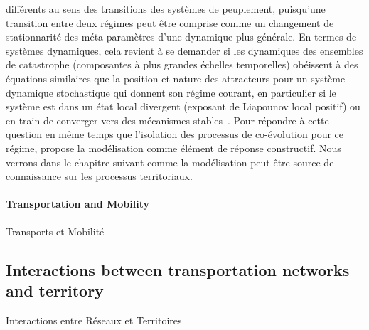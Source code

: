 {différents au sens des transitions des systèmes de peuplement, puisqu'une transition entre deux régimes peut être comprise comme un changement de stationnarité des méta-paramètres d'une dynamique plus générale. En termes de systèmes dynamiques, cela revient à se demander si les dynamiques des ensembles de catastrophe (composantes à plus grandes échelles temporelles) obéissent à des équations similaires que la position et nature des attracteurs pour un système dynamique stochastique qui donnent son régime courant, en particulier si le système est dans un état local divergent (exposant de Liapounov local positif) ou en train de converger vers des mécanismes stables~\cite{sanders1992systeme}. Pour répondre à cette question en même temps que l'isolation des processus de co-évolution pour ce régime, \cite{bretagnolle:tel-00459720} propose la modélisation comme élément de réponse constructif. Nous verrons dans le chapitre suivant comme la modélisation peut être source de connaissance sur les processus territoriaux. 
}


\paragraph{Transportation and Mobility}{Transports et Mobilité}




\subsection{Interactions between transportation networks and territory}{Interactions entre Réseaux et Territoires}


